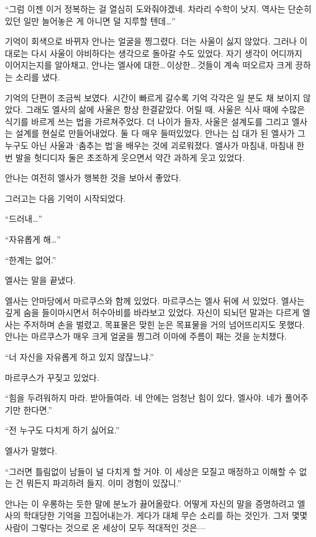 ``그럼 이젠 이거 정복하는 걸 열심히 도와줘야겠네. 차라리 수학이 낫지. 역사는 단순히 있던 일만 늘어놓은 게 아니면 덜 지루할 텐데\ldots''

기억이 회색으로 바뀌자 안나는 얼굴을 찡그렸다. 더는 사울이 싫지 않았다. 그러나 이대로는 다시 사울이 야비하다는 생각으로 돌아갈 수도 있었다. 자기 생각이 어디까지 이어지는지를 알아채고, 안나는 엘사에 대한\ldots\,이상한\ldots\,것들이 계속 떠오르자 크게 끙하는 소리를 냈다.

기억의 단편이 조금씩 보였다. 시간이 빠르게 갈수록 기억 각각은 일 분도 채 보이지 않았다. 그래도 엘사의 삶에 사울은 항상 한결같았다. 어릴 때, 사울은 식사 때에 수많은 식기를 바르게 쓰는 법을 가르쳐주었다. 더 나이가 들자, 사울은 설계도를 그리고 엘사는 설계를 현실로 만들어내었다. 둘 다 매우 들떠있었다. 안나는 십 대가 된 엘사가 그 누구도 아닌 사울과 `춤추는 법'을 배우는 것에 괴로워졌다. 엘사가 마침내, 마침내 한 번 발을 헛디디자 둘은 초조하게 웃으면서 약간 과하게 웃고 있었다.

안나는 여전히 엘사가 행복한 것을 보아서 좋았다.

그러고는 다음 기억이 시작되었다.

``드러내\ldots''

``자유롭게 해\ldots''

``한계는 없어.''

엘사는 말을 끝냈다.

엘사는 안마당에서 마르쿠스와 함께 있었다. 마르쿠스는 엘사 뒤에 서 있었다. 엘사는 깊게 숨을 들이마시면서 허수아비를 바라보고 있었다. 자신이 되뇌던 말과는 다르게 엘사는 주저하며 손을 벌렸고, 목표물은 맞힌 눈은 목표물을 거의 넘어뜨리지도 못했다. 안나는 마르쿠스가 매우 크게 얼굴을 찡그려 이마에 주름이 패는 것을 눈치챘다.

``너 자신을 자유롭게 하고 있지 않잖느냐.''

마르쿠스가 꾸짖고 있었다.

``힘을 두려워하지 마라. 받아들여라. 네 안에는 엄청난 힘이 있다, 엘사야. 네가 풀어주기만 한다면.''

``전 누구도 다치게 하기 싫어요.''

엘사가 말했다.

``그러면 틀림없이 남들이 널 다치게 할 거야. 이 세상은 모질고 매정하고 이해할 수 없는 건 뭐든지 파괴하려 들지. 이미 경험이 있잖니.''

안나는 이 우롱하는 듯한 말에 분노가 끓어올랐다. 어떻게 자신의 말을 증명하려고 엘사의 학대당한 기억을 끄집어내는가. 게다가 대체 무슨 소리를 하는 것인가. 그저 몇몇 사람이 그렇다는 것으로 온 세상이 모두 적대적인 것은—


